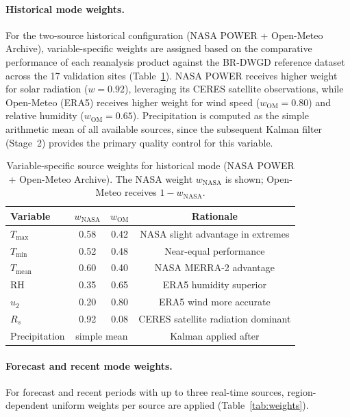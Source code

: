 \documentclass[preprint,review,12pt]{elsarticle}
\begin{document}
\paragraph{Historical mode weights.}
For the two-source historical configuration (NASA POWER + Open-Meteo Archive),
variable-specific weights are assigned based on the comparative performance of
each reanalysis product against the BR-DWGD reference dataset across the 17
validation sites (Table~\ref{tab:hist_weights}). NASA POWER receives
higher weight for solar radiation ($w = 0.92$), leveraging its CERES satellite
observations, while Open-Meteo (ERA5) receives higher weight for wind speed
($w_{\text{OM}} = 0.80$) and relative humidity ($w_{\text{OM}} = 0.65$).
Precipitation is computed as the simple arithmetic mean of all available
sources, since the subsequent Kalman filter (Stage~2) provides the primary
quality control for this variable.

\begin{table}[htbp]
\centering
\caption{Variable-specific source weights for historical mode (NASA POWER +
Open-Meteo Archive). The NASA weight $w_{\text{NASA}}$ is shown; Open-Meteo
receives $1 - w_{\text{NASA}}$.}
\label{tab:hist_weights}
\small
\begin{tabular}{@{}lccc@{}}
\toprule
\textbf{Variable} & $w_{\text{NASA}}$ & $w_{\text{OM}}$ & \textbf{Rationale} \\
\midrule
$T_{\max}$    & 0.58 & 0.42 & NASA slight advantage in extremes \\
$T_{\min}$    & 0.52 & 0.48 & Near-equal performance \\
$T_{\text{mean}}$ & 0.60 & 0.40 & NASA MERRA-2 advantage \\
RH        & 0.35 & 0.65 & ERA5 humidity superior \\
$u_2$     & 0.20 & 0.80 & ERA5 wind more accurate \\
$R_s$     & 0.92 & 0.08 & CERES satellite radiation dominant \\
Precipitation & \multicolumn{2}{c}{simple mean} & Kalman applied after \\
\bottomrule
\end{tabular}
\end{table}

\paragraph{Forecast and recent mode weights.}
For forecast and recent periods with up to three real-time sources,
region-dependent uniform weights per source are applied
(Table~\ref{tab:weights}).
\end{document}
